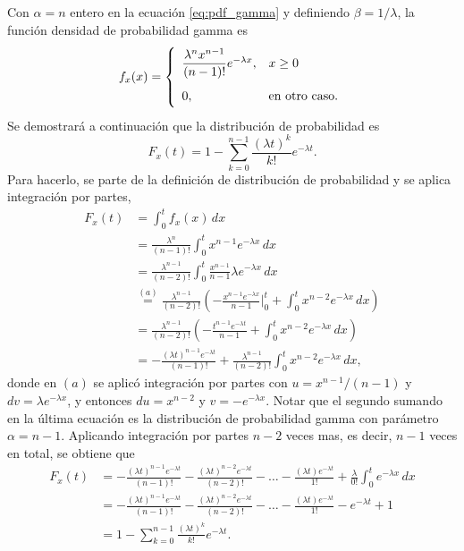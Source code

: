 \documentclass[a4paper]{report}
\begin{document}
Con \(\alpha=n\) entero en la ecuación \ref{eq:pdf_gamma} y definiendo \(\beta=1/\lambda\), la función densidad de probabilidad gamma es
\begin{equation}\label{eq:pdf_gamma_integer}
\def\arraystretch{2.0}
 f_x(x)=
 \left\{\begin{array}{ll}
  \dfrac{\lambda^nx^{n-1}}{(n-1)!} e^{-\lambda x}, & x\geq 0\\
  0, & \textrm{en otro caso.}
 \end{array} \right.
\end{equation}
Se demostrará a continuación que la distribución de probabilidad es
\[
 F_x(t)=1-\sum_{k=0}^{n-1}\frac{(\lambda t)^k}{k!}e^{-\lambda t}.
\]
Para hacerlo, se parte de la definición de distribución de probabilidad y se aplica integración por partes,
\begin{align*}
 F_x(t)&=\int_{0}^{t}f_x(x)\,dx\\
   &=\frac{\lambda^n}{(n-1)!}\int_{0}^{t}x^{n-1}e^{-\lambda x}\,dx\\
   &=\frac{\lambda^{n-1}}{(n-2)!}\int_{0}^{t}\frac{x^{n-1}}{n-1}\lambda e^{-\lambda x}\,dx\\
   &\overset{(a)}{=}\frac{\lambda^{n-1}}{(n-2)!}\left(-\frac{x^{n-1}e^{-\lambda x}}{n-1}\bigg|_{0}^{t}+\int_{0}^{t}x^{n-2}e^{-\lambda x}\,dx\right)\\
   &=\frac{\lambda^{n-1}}{(n-2)!}\left(-\frac{t^{n-1}e^{-\lambda t}}{n-1}+\int_{0}^{t}x^{n-2}e^{-\lambda x}\,dx\right)\\
   &=-\frac{(\lambda t)^{n-1}e^{-\lambda t}}{(n-1)!}+\frac{\lambda^{n-1}}{(n-2)!}\int_{0}^{t}x^{n-2}e^{-\lambda x}\,dx,
\end{align*}
donde en \((a)\) se aplicó integración por partes con \(u=x^{n-1}/(n-1)\) y \(dv=\lambda e^{-\lambda x}\), y entonces \(du=x^{n-2}\) y \(v=-e^{-\lambda x}\). Notar que el segundo sumando en la última ecuación es la distribución de probabilidad gamma con parámetro \(\alpha=n-1\).
Aplicando integración por partes \(n-2\) veces mas, es decir, \(n-1\) veces en total, se obtiene que
\begin{align*}
 F_x(t)&=-\frac{(\lambda t)^{n-1}e^{-\lambda t}}{(n-1)!}-\frac{(\lambda t)^{n-2}e^{-\lambda t}}{(n-2)!}-\dots-\frac{(\lambda t)e^{-\lambda t}}{1!}+\frac{\lambda}{0!}\int_{0}^{t}e^{-\lambda x}\,dx\\
   &=-\frac{(\lambda t)^{n-1}e^{-\lambda t}}{(n-1)!}-\frac{(\lambda t)^{n-2}e^{-\lambda t}}{(n-2)!}-\dots-\frac{(\lambda t)e^{-\lambda t}}{1!}-e^{-\lambda t}+1\\
   &=1-\sum_{k=0}^{n-1}\frac{(\lambda t)^k}{k!}e^{-\lambda t}.
\end{align*}
\end{document}
